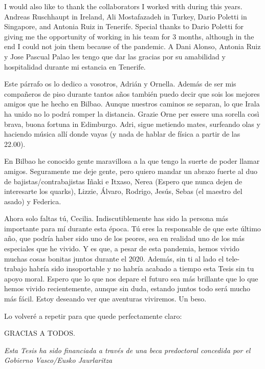 \documentclass[a4paper, 12pt, twoside, openright]{Thesis}  %
\begin{document}
{I would also like to thank the collaborators I worked with during this years. Andreas Ruschhaupt in Ireland, Ali Mostafazadeh in Turkey, Dario Poletti in Singapore, and Antonia Ruiz in Tenerife. Special thanks to Dario Poletti for giving me the opportunity of working in his team for 3 months, although in the end I could not join them because of the pandemic. A Dani Alonso, Antonia Ruiz y Jose Pascual Palao les tengo que dar las gracias por su amabilidad y hospitalidad durante mi estancia en Tenerife.

Este párrafo os lo dedico a vosotros, Adrián y Ornella. Además de ser mis compañeros de piso durante tantos años también puedo decir que sois los mejores amigos que he hecho en Bilbao. Aunque nuestros caminos se separan, lo que Irala ha unido no lo podrá romper la distancia. Grazie Orne per essere una sorella così brava, buona fortuna in Edimburgo. Adri, sigue metiendo mates, surfeando olas y haciendo música allí donde vayas (y nada de hablar de física a partir de las 22.00).

En Bilbao he conocido gente maravillosa a la que tengo la suerte de poder llamar amigos. Seguramente me deje gente, pero quiero mandar un abrazo fuerte al duo de bajistas/contrabajistas Iñaki e Itxaso, Nerea (Espero que nunca dejen de interesarte los quarks), Lizzie, Álvaro, Rodrigo, Jesús, Sebas (el maestro del asado) y Federica.

Ahora solo faltas tú, Cecilia. Indiscutiblemente has sido la persona más importante para mí durante esta época. Tú eres la responsable de que este último año, que podría haber sido uno de los peores, sea en realidad uno de los más especiales que he vivido.  Y es que, a pesar de esta pandemia, hemos vivido muchas cosas bonitas juntos durante el 2020. Además, sin ti al lado el tele-trabajo habría sido insoportable y no habría acabado a tiempo esta Tesis sin tu apoyo moral. Espero que lo que nos depare el futuro sea más brillante que lo que hemos vivido recientemente, aunque sin duda, estando juntos todo será mucho más fácil. Estoy deseando ver que aventuras viviremos. Un beso.

Lo volveré a repetir para que quede perfectamente claro:
\begin{center}
  GRACIAS A TODOS.
\end{center}

\it{Esta Tesis ha sido financiada a trav\'es de una beca predoctoral concedida por el Gobierno Vasco/Eusko Jaurlaritza}
}

\clearpage  %
\end{document}
